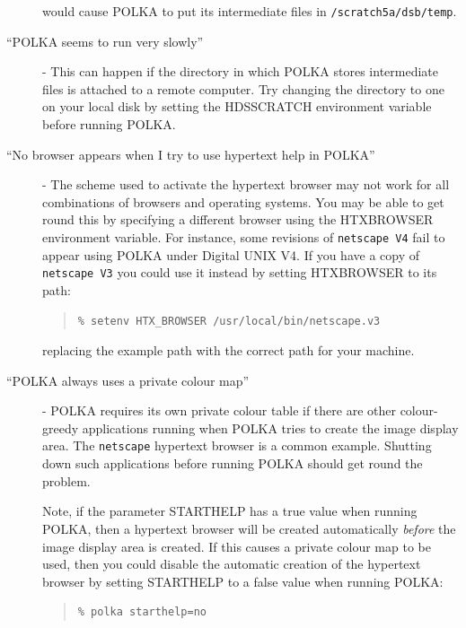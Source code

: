 \documentclass[twoside,11pt]{article}
\renewcommand{\_}{\texttt{\symbol{95}}}
\newenvironment{myquote}{\begin{quote}\begin{small}}{\end{small}\end{quote}}
\begin{document}
\begin{description}
would cause POLKA to put its intermediate files in \texttt{/scratch5a/dsb/temp}.

\item [``POLKA seems to run very slowly''] - This can happen if the
directory in which POLKA stores intermediate files is attached to a remote 
computer. Try changing the directory to one on your local disk by setting
the HDS\_SCRATCH environment variable before running POLKA.

\item [``No browser appears when I try to use hypertext help in POLKA''] -
The scheme used to activate the hypertext browser may not work for all
combinations of browsers and operating systems. You may be able to get
round this by specifying a different browser using the HTX\_BROWSER
environment variable. For instance, some revisions of \texttt{netscape V4}
fail to appear using POLKA under Digital UNIX V4. If you have a copy of 
\texttt{netscape V3} you could use it instead by setting HTX\_BROWSER to
its path:

\begin{myquote}
\begin{verbatim}
% setenv HTX_BROWSER /usr/local/bin/netscape.v3
\end{verbatim}
\end{myquote}

replacing the example path with the correct path for your machine.

\item [``POLKA always uses a private colour map''] - POLKA
requires its own private colour table if there are other colour-greedy
applications running when POLKA tries to create the image display area.
The \texttt{netscape} hypertext browser is a common example. Shutting down
such applications before running POLKA should get round the problem. 

Note, if the parameter STARTHELP has a true value when running POLKA,
then a hypertext browser will be created automatically \emph{before} the
image display area is created. If this causes a private colour map to be
used, then you could disable the automatic creation of the hypertext
browser by setting STARTHELP to a false value when running POLKA:

\begin{myquote}
\begin{verbatim}
% polka starthelp=no
\end{verbatim}
\end{myquote}


\end{description}
\end{document}
